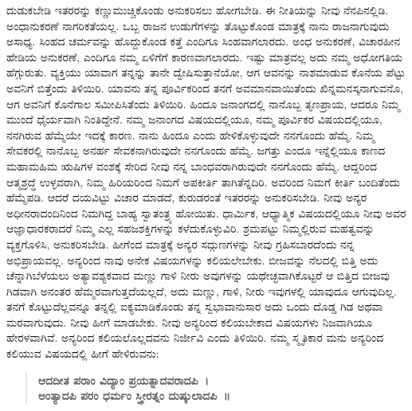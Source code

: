 ದುಡುಕಬೇಡಿ ಇತರರನ್ನು ಕಣ್ಣುಮುಚ್ಚಿಕೊಂಡು ಅನುಕರಿಸಲು ಹೋಗಬೇಡಿ. ಈ ನೀತಿಯನ್ನು ನೀವು ನೆನಪಿನಲ್ಲಿಡಿ. ಅಂಧಾನುಕರಣೆ ನಾಗರಿಕತೆಯಲ್ಲ. ಒಬ್ಬ ರಾಜನ ಉಡುಗೆಗಳನ್ನು ತೊಟ್ಟುಕೊಂಡ ಮಾತ್ರಕ್ಕೆ ನಾನು ರಾಜನಾಗುವುದು ಅಸಾಧ್ಯ. ಸಿಂಹದ ಚರ್ಮವನ್ನು ಹೊದ್ದುಕೊಂಡ ಕತ್ತೆ ಎಂದಿಗೂ ಸಿಂಹವಾಗಲಾರದು. ಅಂಧ ಅನುಕರಣೆ, ವಿಚಾರಹೀನ ಹೇಡಿಯ ಅನುಕರಣೆ, ಎಂದಿಗೂ ನಮ್ಮ ಏಳಿಗೆಗೆ ಕಾರಣವಾಗಲಾರದು. ಇಷ್ಟು ಮಾತ್ರವಲ್ಲ ಅದು ನಮ್ಮ ಅಧೋಗತಿಯ ಹೆಗ್ಗುರುತು. ವ್ಯಕ್ತಿಯು ಯಾವಾಗ ತನ್ನನ್ನು ತಾನೇ ದ್ವೇಷಿಸುತ್ತಾನೆಯೋ, ಆಗ ಆವನನ್ನು ನಾಶಮಾಡುವ ಕೊನೆಯ ಪೆಟ್ಟು ಅವನಿಗೆ ಬಿತ್ತೆಂದು ತಿಳಿಯಿರಿ. ಯಾವನು ತನ್ನ ಪೂರ್ವಿಕರಿಂದ ತನಗೆ ಅವಮಾನವಾಯಿತೆಂದು ಖಿನ್ನಮನಸ್ಕನಾಗುವನೊ, ಆಗ ಅವನಿಗೆ ಕೊನೆಗಾಲ ಸಮೀಪಿಸಿತೆಂದು ತಿಳಿಯಿರಿ. ಹಿಂದೂ ಜನಾಂಗದಲ್ಲಿ ನಾನೊಬ್ಬ ತೃಣಪ್ರಾಯ, ಆದರೂ ನಿಮ್ಮ ಮುಂದೆ ಧೈರ್ಯವಾಗಿ ನಿಂತಿದ್ದೇನೆ. ನಮ್ಮ ಜನಾಂಗದ ವಿಷಯದಲ್ಲಿಯೂ, ನಮ್ಮ ಪೂರ್ವಿಕರ ವಿಷಯದಲ್ಲಿಯೂ, ನನಗಿರುವ ಹೆಮ್ಮೆಯೇ ಇದಕ್ಕೆ ಕಾರಣ. ನಾನು ಹಿಂದೂ ಎಂದು ಹೇಳಿಕೊಳ್ಳುವುದೇ ನನಗೊಂದು ಹೆಮ್ಮೆ. ನಿಮ್ಮ ಸೇವಕರಲ್ಲಿ ನಾನೊಬ್ಬ ಅನರ್ಹ ಸೇವಕನಾಗಿರುವುದೇ ನನಗೊಂದು ಹೆಮ್ಮೆ. ಜಗತ್ತು ಎಂದೂ ಇನ್ನೆಲ್ಲಿಯೂ ಕಾಣದ ಮಹಾಮಹಿಮ ಋಷಿಗಳ ವಂಶಕ್ಕೆ ಸೇರಿದ ನೀವು ನನ್ನ ಬಾಂಧವರಾಗಿರುವುದೇ ನನಗೊಂದು ಹೆಮ್ಮೆ. ಆದ್ದರಿಂದ ಆತ್ಮಶ್ರದ್ಧೆ ಉಳ್ಳವರಾಗಿ, ನಿಮ್ಮ ಹಿರಿಯರಿಂದ ನಿಮಗೆ ಅಪಕೀರ್ತಿ ತಾಗಿತೆನ್ನದಿರಿ. ಅವರಿಂದ ನಿಮಗೆ ಕೀರ್ತಿ ಬಂದಿತೆಂದು ಹೆಮ್ಮೆಪಡಿ. ಆದರೆ ದಯವಿಟ್ಟು ವಿಚಾರ ಮಾಡದೆ, ಕುರುಡರಂತೆ ಇತರರನ್ನು ಅನುಕರಿಸಬೇಡಿ. ನೀವು ಅನ್ಯರ ಅಧೀನರಾದಂದಿನಿಂದ ನಿಮಗಿದ್ದ ಬಾಹ್ಯ ಸ್ವಾತಂತ್ರ್ಯ ಹೋಯಿತು. ಧಾರ್ಮಿಕ, ಆಧ್ಯಾತ್ಮಿಕ ವಿಷಯದಲ್ಲಿಯೂ ನೀವು ಅವರ ಆಜ್ಞಾಧಾರಕರಾದರೆ ನಿಮ್ಮ ಎಲ್ಲ ಸಹಜಶಕ್ತಿಗಳನ್ನು ಕಳೆದುಕೊಳ್ಳುವಿರಿ. ಶ್ರಮಪಟ್ಟು ನಿಮ್ಮಲ್ಲಿರುವ ಮಹತ್ವವನ್ನು ವ್ಯಕ್ತಗೊಳಿಸಿ, ಅನುಕರಿಸಬೇಡಿ. ಹೀಗೆಂದ ಮಾತ್ರಕ್ಕೆ ಅನ್ಯರ ಸದ್ಗುಣಗಳನ್ನು ನೀವು ಗ್ರಹಿಸಬಾರದೆಂದು ನನ್ನ ಅಭಿಪ್ರಾಯವಲ್ಲ. ಅನ್ಯರಿಂದ ನಾವು ಅನೇಕ ವಿಷಯಗಳನ್ನು ಕಲಿಯಲೇಬೇಕು. ಬೀಜವನ್ನು ನೆಲದಲ್ಲಿ ಬಿತ್ತಿ ಅದು ಚೆನ್ನಾಗಿ\break ಬೆಳೆಯಲು ಅತ್ಯಾವಶ್ಯಕವಾದ ಮಣ್ಣು ಗಾಳಿ ನೀರು ಅವುಗಳನ್ನು ಯಥೇಚ್ಛವಾಗಿಕೊಟ್ಟರೆ ಆ ಬಿತ್ತಿದ ಬೀಜವು ಗಿಡವಾಗಿ ಅನಂತರ ಹೆಮ್ಮರವಾಗುತ್ತದೆಯಲ್ಲದೆ, ಅದು ಮಣ್ಣು, ಗಾಳಿ, ನೀರು ಇವುಗಳಲ್ಲಿ ಯಾವುದೂ ಆಗುವುದಿಲ್ಲ. ತನಗೆ ಕೊಟ್ಟುದೆಲ್ಲವನ್ನೂ ತನ್ನಲ್ಲಿ ಐಕ್ಯಮಾಡಿಕೊಂಡು ತನ್ನ ಸ್ವಭಾವಾನುಸಾರ ಅದು ಒಂದು ದೊಡ್ಡ ಗಿಡ ಅಥವಾ ಮರವಾಗುವುದು. ನೀವು ಹೀಗೆ ಮಾಡಬೇಕು. ನೀವು ಅನ್ಯರಿಂದ ಕಲಿಯಬೇಕಾದ ವಿಷಯಗಳು ನಿಜವಾಗಿಯೂ ಹೇರಳವಾಗಿವೆ. ಅನ್ಯರಿಂದ ಕಲಿಯಲೊಲ್ಲದವನು ನಿರ್ಜೀವಿ ಎಂದು ತಿಳಿಯಿರಿ. ನಮ್ಮ ಸ್ಮೃತಿಕಾರ ಮನು ಅನ್ಯರಿಂದ ಕಲಿಯುವ ವಿಷಯದಲ್ಲಿ ಹೀಗೆ ಹೇಳಿರುವನು:
\begin{verse}
\textbf{ಆದದೀತ ಪರಾಂ ವಿದ್ಯಾಂ ಪ್ರಯತ್ನಾದವರಾದಪಿ~।}\\\textbf{ಅಂತ್ಯಾದಪಿ ಪರಂ ಧರ್ಮಂ ಸ್ತ್ರೀರತ್ನಂ ದುಷ್ಕುಲಾದಪಿ~॥}
\end{verse}

